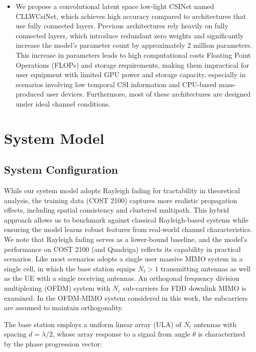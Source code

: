 \documentclass[lettersize,journal]{IEEEtran}
\begin{document}
\begin{itemize}
	\item We propose a convolutional latent space low-light CSINet named CLLWCsiNet, which achieves high accuracy compared to architectures that use fully connected layers. Previous architectures rely heavily on fully connected layers, which introduce redundant zero weights and significantly increase the model's parameter count by approximately 2 million parameters. This increase in parameters leads to high computational costs Floating Point Operations (FLOPs) and storage requirements, making them impractical for user equipment with limited GPU power and storage capacity, especially in scenarios involving low temporal CSI information and CPU-based mass-produced user devices. Furthermore, most of these architectures are designed under ideal channel conditions.

	
	
	
\end{itemize}


\section{System Model}
\label{sec:system_model}
\subsection{System Configuration}
While our system model adopts Rayleigh fading for tractability in theoretical analysis, the training data (COST 2100) captures more realistic propagation effects, including spatial consistency and clustered multipath. This hybrid approach allows us to benchmark against classical Rayleigh-based systems while ensuring the model learns robust features from real-world channel characteristics. We note that Rayleigh fading serves as a lower-bound baseline, and the model’s performance on COST 2100 (and Quadriga) reflects its capability in practical scenarios.
Like most scenarios adopts a single user massive MIMO system in a single cell, in which the base station equips $N_{t} > 1$ transmitting antennas as well as the UE with a single receiving antennas. An orthogonal frequency division multiplexing (OFDM) system with $N_{c}$ sub-carriers for FDD downlink  MIMO is examined. In the OFDM-MIMO system considered in this work, the subcarriers are assumed to maintain orthogonality.

The base station employs a uniform linear array (ULA) of $N_t$ antennas with spacing $d = \lambda/2$, whose array response to a signal from angle $\theta$ is characterized by the phase progression vector:
\end{document}
